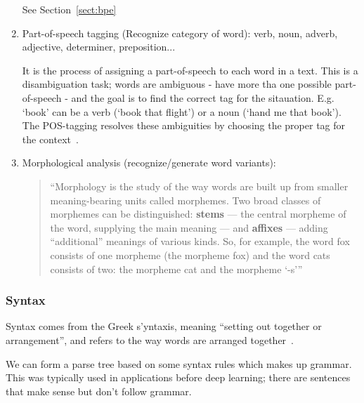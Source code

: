 \documentclass[11pt]{article}
\begin{document}
\begin{enumerate}
    See Section~\ref{sect:bpe}

    \item Part-of-speech tagging (Recognize category of word): verb, noun, adverb, adjective, determiner, preposition... 
    
    It is the process of assigning a part-of-speech to each word in a text. This is a disambiguation task; words are ambiguous - have more tha one possible part-of-speech - and the goal is to find the correct tag for the sitauation. E.g. `book' can be a verb (`book that flight') or a noun (`hand me that book'). The POS-tagging resolves these ambiguities by choosing the proper tag for the context~\cite{book-speech-and-language-processing}.

    \item Morphological analysis (recognize/generate word variants):
    
    \begin{quote}
        ``Morphology is the study of the way words are built up from smaller meaning-bearing units called morphemes. Two broad classes of morphemes can be distinguished: \textbf{stems} — the central morpheme of the word, supplying the main meaning — and \textbf{affixes} — adding “additional” meanings of various kinds. So, for example, the word fox consists of one morpheme (the morpheme fox) and the word cats consists of two: the morpheme cat and the morpheme `-s'''~\cite{book-speech-and-language-processing}
    \end{quote}
\end{enumerate}

\subsubsection{Syntax}

Syntax comes from the Greek s'yntaxis, meaning “setting out together or arrangement”, and refers to the way words are arranged together~\cite{book-speech-and-language-processing}.

We can form a parse tree based on some syntax rules which makes up grammar. This was typically used in applications before deep learning; there are sentences that make sense but don't follow grammar.
\end{document}
